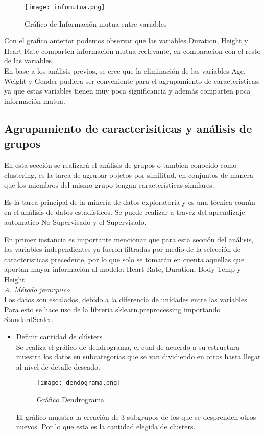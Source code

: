 \documentclass[5p,times,authoryear]{sciarticle}
\begin{document}
\begin{multicols}{2}
{\begin{figure}[H]
\centering
  \texttt{[image: infomutua.png]}\\
  \caption{Gráfico de Información mutua entre variables}\label{fig1}
\end{figure}

Con el grafico anterior podemos observar que las variables Duration, Height y Heart Rate comparten información mutua reelevante, en comparacion con el resto de las variables\\

En base a los análisis previos, se cree que la eliminación de las variables Age, Weight y Gender pudiera ser conveniente para el agrupamiento de caracteristicas, ya que estas variables tienen muy poca significancia y además comparten poca información mutua.

\subsection{Agrupamiento de caracterisiticas y análisis de grupos}
En esta sección se realizará el análisis de grupos o tambien conocido como clustering, es la tarea de agrupar objetos por similitud, en conjuntos de manera que los miembros del mismo grupo tengan características similares. 

Es la tarea principal de la minería de datos exploratoria y es una técnica común en el análisis de datos estadísticos. Se puede realizar a travez del aprendizaje automatico No Supervisado y el Supervisado.

En primer instancia es importante mencionar que para esta sección del análisis, las variables independientes ya fueron filtradas por medio de la selección de caracteristicas precedente, por lo que solo se tomarán en cuenta aquellas que aportan mayor información al modelo: Heart Rate, Duration, Body Temp y Height\\

\emph {A. Método jerarquico } \\
Los datos son escalados, debido a la diferencia de unidades entre las variables. Para esto se hace uso de la libreria sklearn.preprocessing importando StandardScaler.
\begin{itemize}

\item Definir cantidad de clústers\\
Se realiza el gráfico de dendrograma, el cual de acuerdo a su estructura muestra los datos en subcategorías que se van dividiendo en otros hasta llegar al nivel de detalle deseado.
\begin{figure}[H]
\centering
  \texttt{[image: dendograma.png]}\\
  \caption{Gráfico Dendrograma}\label{fig1}
\end{figure}
El gráfico muestra la creación de 3 subgrupos de los que se desprenden otros nuevos. Por lo que esta es la cantidad elegida de clusters.


\end{itemize}}
\end{multicols}
\end{document}
